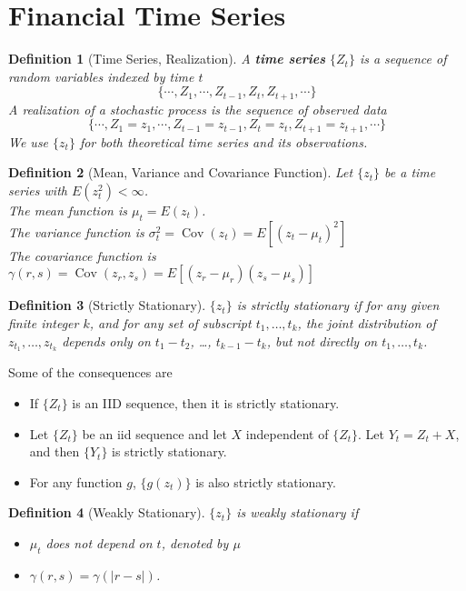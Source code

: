 \documentclass[11pt]{article}
\newtheorem{definition}{Definition}[section]
\theoremstyle{definition}
\DeclareMathOperator{\cov}{Cov}
\begin{document}
\section{Financial Time Series}
\begin{definition}[Time Series, Realization]
\normalfont A \textbf{time series} $\{Z_t\}$ is a sequence of random variables indexed by time $t$
\[
\{\cdots, Z_1, \cdots, Z_{t-1}, Z_t, Z_{t+1},\cdots\}
\]
A realization of a stochastic process is the sequence of observed data
\[
\{\cdots, Z_1=z_1,\cdots, Z_{t-1}=z_{t-1},Z_t=z_t, Z_{t+1}=z_{t+1},\cdots\}
\]
We use $\{z_t\}$ for both theoretical time series and its observations.
\end{definition}
\begin{definition}[Mean, Variance and Covariance Function]
\normalfont Let $\{z_t\}$ be a time series with $E(z_t^2)<\infty$.\\
The mean function is $\mu_t = E(z_t)$.\\
The variance function is $\sigma_t^2 = \cov(z_t) = E[(z_t-\mu_t)^2]$\\
The covariance function is $\gamma(r,s)=\cov(z_r, z_s)=E[(z_r-\mu_r)(z_s-\mu_s)]$
\end{definition}
\begin{definition}[Strictly Stationary]
\normalfont $\{z_t\}$ is strictly stationary if for any given finite integer $k$, and for any set of subscript $t_1,\ldots, t_k$, the joint distribution of $z_{t_1}, \ldots, z_{t_k}$ depends only on $t_1-t_2$, \ldots, $t_{k-1}-t_k$, but not directly on $t_1,\ldots, t_k$.
\end{definition}
Some of the consequences are
\begin{itemize}
  \item If $\{Z_t\}$ is an IID sequence, then it is strictly stationary.
  \item Let $\{Z_t\}$ be an iid sequence and let $X$ independent of $\{Z_t\}$. Let $Y_t = Z_t + X$, and then $\{Y_t\}$ is strictly stationary.
  \item For any function $g$, $\{g(z_t)\}$ is also strictly stationary.
\end{itemize}
\begin{definition}[Weakly Stationary]
\normalfont $\{z_t\}$ is weakly stationary if 
\begin{itemize}
  \item $\mu_t$ does not depend on $t$, denoted by $\mu$
  \item $\gamma(r,s)=\gamma(|r-s|)$. 
\end{itemize}
\end{definition}
\end{document}

